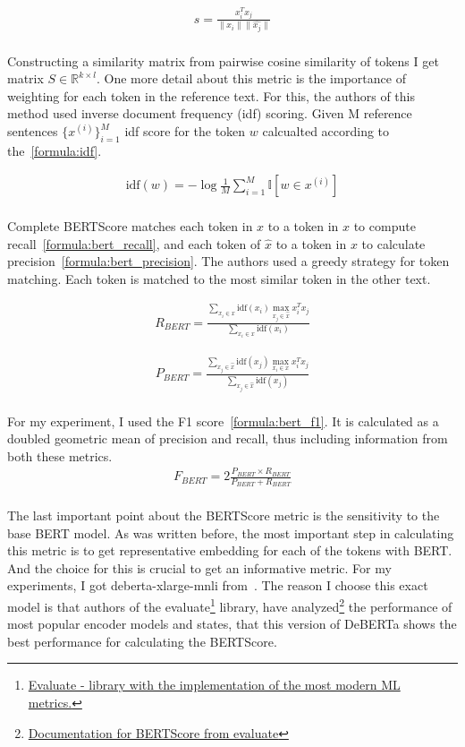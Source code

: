 \begin{align}\label{formula:cosine_sim}
    s = \frac{x_i^T x_j}{\|x_i\| \|\hat{x_j}\|}
\end{align}\\
Constructing a similarity matrix from pairwise cosine similarity of tokens I get matrix $S \in \mathbb{R}^{k \times l}$. One more detail about this metric is the importance of weighting for each token in the reference text. For this, the authors of this method used inverse document frequency (idf) scoring. Given M reference sentences $\{ x^{(i)} \}_{i=1}^M$ idf score for the token $w$ calcualted according to the~\ref{formula:idf}. 

\begin{align}\label{formula:idf}
    \text{idf}(w) = -\log \frac{1}{M} \sum_{i=1}^{M} \mathbb{I}\left[ w \in x^{(i)} \right]
\end{align}\\
Complete BERTScore matches each token in $x$ to a token in $\hat{x}$ to compute recall~\ref{formula:bert_recall}, and each token of $\hat{x}$ to a token in $x$ to calculate precision~\ref{formula:bert_precision}. The authors used a greedy strategy for token matching. Each token is matched to the most similar token in the other text. 

\begin{align}\label{formula:bert_recall}
    R_{BERT} = \frac{\sum_{x_i \in x } \text{idf}(x_i) \max_{x_j \in \hat{x}} x_i^T x_j}{\sum_{x_i \in x} \text{idf}(x_i)}
\end{align}

\begin{align}\label{formula:bert_precision}
    P_{BERT} = \frac{\sum_{x_j \in \hat{x} } \text{idf}(x_j) \max_{x_i \in x} x_i^T x_j}{\sum_{x_j \in \hat{x}} \text{idf}(x_j)}
\end{align}\\
For my experiment, I used the F1 score~\ref{formula:bert_f1}. It is calculated as a doubled geometric mean of precision and recall, thus including information from both these metrics. 
\begin{align}\label{formula:bert_f1}
    F_{BERT} = 2\frac{P_{BERT} \times R_{BERT}}{P_{BERT} + R_{BERT}}
\end{align}\\
The last important point about the BERTScore metric is the sensitivity to the base BERT model. As was written before, the most important step in calculating this metric is to get representative embedding for each of the tokens with BERT\@. And the choice for this is crucial to get an informative metric. For my experiments, I got deberta-xlarge-mnli from~\cite{he2021deberta}. The reason I choose this exact model is that authors of the evaluate\footnote[1]{\href{https://huggingface.co/docs/evaluate/index}{Evaluate - library with the implementation of the most modern ML metrics.}} library, have analyzed\footnote[1]{\href{https://huggingface.co/spaces/evaluate-metric/bertscore}{Documentation for BERTScore from evaluate}} the performance of most popular encoder models and states, that this version of DeBERTa shows the best performance for calculating the BERTScore.
